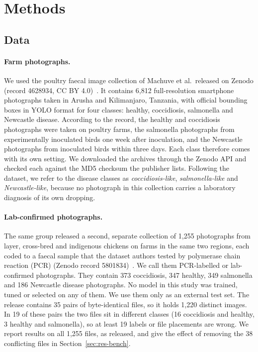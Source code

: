 \section{Methods}
\label{sec:methods}

\subsection{Data}
\label{sec:data}

\paragraph{Farm photographs.} We used the poultry faecal image collection of Machuve et al.\ released on Zenodo
(record 4628934, CC BY 4.0)~\cite{machuve2022,machuve2021farm}. It contains 6,812 full-resolution smartphone
photographs taken in Arusha and Kilimanjaro, Tanzania, with official bounding boxes in YOLO format for four classes:
healthy, coccidiosis, salmonella and Newcastle disease. According to the record, the healthy and coccidiosis
photographs were taken on poultry farms, the salmonella photographs from experimentally inoculated birds one week
after inoculation, and the Newcastle photographs from inoculated birds within three days. Each class therefore comes
with its own setting. We downloaded the archives through the Zenodo API and checked each against the MD5 checksum
the publisher lists. Following the dataset, we refer to the disease classes as \emph{coccidiosis-like},
\emph{salmonella-like} and \emph{Newcastle-like}, because no photograph in this collection carries a laboratory
diagnosis of its own dropping.

\paragraph{Lab-confirmed photographs.} The same group released a second, separate collection of 1,255 photographs
from layer, cross-bred and indigenous chickens on farms in the same two regions, each coded to a faecal sample that
the dataset authors tested by polymerase chain reaction (PCR) (Zenodo record 5801834)~\cite{machuve2021pcr}. We call
them PCR-labelled or lab-confirmed photographs. They contain 373 coccidiosis, 347 healthy, 349 salmonella and 186
Newcastle disease photographs. No model in this study was trained, tuned or selected on any of them. We use them only
as an external test set. The release contains 35 pairs of byte-identical files, so it holds 1,220 distinct images.
In 19 of these pairs the two files sit in different classes (16 coccidiosis and healthy, 3 healthy and salmonella),
so at least 19 labels or file placements are wrong. We report results on all 1,255 files, as released, and give the
effect of removing the 38 conflicting files in Section~\ref{sec:res-bench}.

